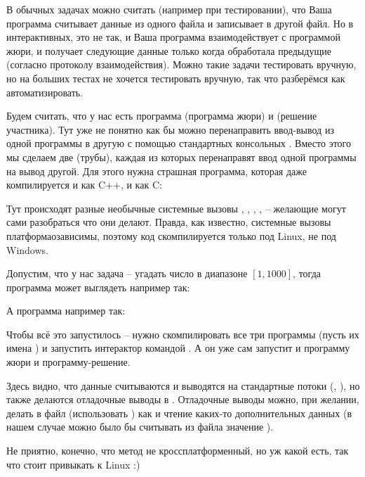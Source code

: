 В обычных задачах можно считать (например при тестировании), что Ваша программа считывает данные из одного файла и записывает в другой файл. Но в интерактивных, это не так, и Ваша программа взаимодействует с программой жюри, и получает следующие данные только когда обработала предыдущие (согласно протоколу взаимодействия). Можно такие задачи тестировать вручную, но на больших тестах не хочется тестировать вручную, так что разберёмся как автоматизировать.

Будем считать, что у нас есть программа  (программа жюри) и  (решение участника). Тут уже не понятно как бы можно перенаправить ввод-вывод из одной программы в другую с помощью стандартных консольных \lsh{> <}. Вместо этого мы сделаем две  (трубы), каждая из которых перенаправят ввод одной программы на вывод другой. Для этого нужна страшная программа, которая даже компилируется и как C++, и как C:


Тут происходят разные необычные системные вызовы , , , ,  -- желающие могут сами разобраться что они делают. Правда, как известно, системные вызовы платформаозависимы, поэтому код скомпилируется только под Linux, не под Windows.

Допустим, что у нас задача -- угадать число в диапазоне $[1, 1000]$, тогда программа  может выглядеть например так:

\progreset
{}

А программа  например так:

\progreset
{}

Чтобы всё это запустилось -- нужно скомпилировать все три программы (пусть их имена ) и запустить интерактор командой . А он уже сам запустит и программу жюри и программу-решение.

Здесь видно, что данные считываются и выводятся на стандартные потоки (, ), но также делаются отладочные выводы в . Отладочные выводы можно, при желании, делать в файл (использовать ) как и чтение каких-то дополнительных данных (в нашем случае можно было бы считывать из файла значение ).

Не приятно, конечно, что метод не кроссплатформенный, но уж какой есть, так что стоит привыкать к Linux :)
